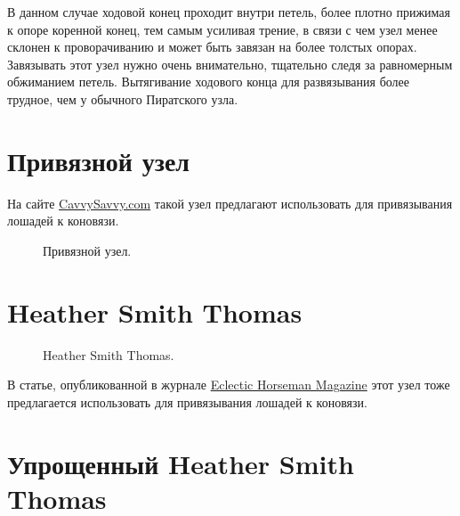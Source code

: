 \documentclass{artikel1}
\begin{document}
В данном случае ходовой конец проходит внутри петель, более плотно прижимая к опоре коренной конец, тем самым усиливая трение, в связи с чем узел менее склонен к проворачиванию и может быть завязан на более толстых опорах. Завязывать этот узел нужно очень внимательно, тщательно следя за равномерным обжиманием петель. Вытягивание ходового конца для развязывания более трудное, чем у обычного Пиратского узла.

\section{Привязной узел}

На сайте \href{https://cavvysavvy.tsln.com/blog/knots-tying-horse/}{CavvySavvy.com} такой узел предлагают использовать для привязывания лошадей к коновязи.

\begin{figure}[H]\centering
	\subfloat[Завязывание]{\label{ris:CavvySavvy_1}
	\tcbox[enhanced jigsaw,colframe=black,opacityframe=0.5,opacityback=0.5,height=7cm]
		{\centering
			}
		}
\hfill
	\subfloat[Результат]{\label{ris:CavvySavvy_2}
	\tcbox[enhanced jigsaw,colframe=black,opacityframe=0.5,opacityback=0.5,height=7cm]
		{\centering
			}
		}
	\caption{Привязной узел.}\label{ris:CavvySavvy}
\end{figure}

\section{Heather Smith Thomas}

\begin{figure}[H]\centering
	\begin{minipage}{1\linewidth}
		\begin{center}
			\tcbox[enhanced jigsaw,colframe=black,opacityframe=0.5,opacityback=0.5]
			{\centering{}}
		\end{center}
	\end{minipage}
\caption{Heather Smith Thomas.}
\label{ris:Heather_Smith_Thomas}
\end{figure}

В статье, опубликованной в журнале \href{http://eclectic-horseman.com/}{Eclectic Horseman Magazine} этот узел тоже предлагается использовать для привязывания лошадей к коновязи.

\section{Упрощенный Heather Smith Thomas}
\end{document}
